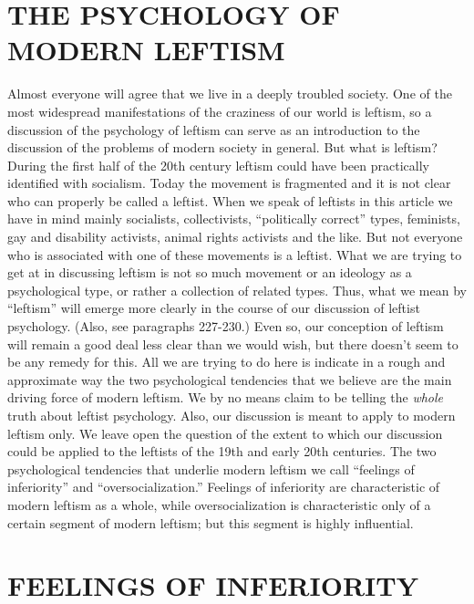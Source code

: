 \chapter{THE PSYCHOLOGY OF MODERN LEFTISM}

 Almost everyone will agree that we live in a deeply troubled society. One of the most widespread manifestations of the craziness of our world is leftism, so a discussion of the psychology of leftism can serve as an introduction to the discussion of the problems of modern society in general.
 But what is leftism? During the first half of the 20th century leftism could have been practically identified with socialism. Today the movement is fragmented and it is not clear who can properly be called a leftist. When we speak of leftists in this article we have in mind mainly socialists, collectivists, “politically correct” types, feminists, gay and disability activists, animal rights activists and the like. But not everyone who is associated with one of these movements is a leftist. What we are trying to get at in discussing leftism is not so much movement or an ideology as a psychological type, or rather a collection of related types. Thus, what we mean by “leftism” will emerge more clearly in the course of our discussion of leftist psychology. (Also, see paragraphs 227-230.)
 Even so, our conception of leftism will remain a good deal less clear than we would wish, but there doesn’t seem to be any remedy for this. All we are trying to do here is indicate in a rough and approximate way the two psychological tendencies that we believe are the main driving force of modern leftism. We by no means claim to be telling the {\em whole} truth about leftist psychology. Also, our discussion is meant to apply to modern leftism only. We leave open the question of the extent to which our discussion could be applied to the leftists of the 19th and early 20th centuries.\break
{} The two psychological tendencies that underlie modern leftism we call “feelings of inferiority” and “oversocialization.” Feelings of inferiority are characteristic of modern leftism as a whole, while oversocialization is characteristic only of a certain segment of modern leftism; but this segment is highly influential.

\chapter{FEELINGS OF INFERIORITY}

